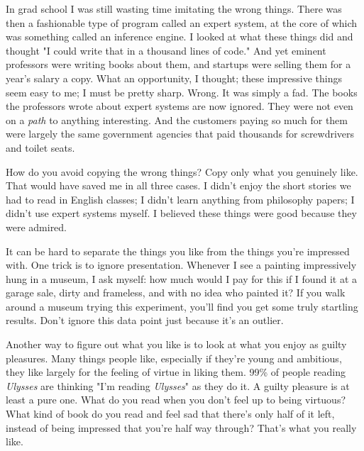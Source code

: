 In grad school I was still wasting time
                  imitating the wrong things. There was then a fashionable type
                  of program called an expert system, at the core of which was
                  something called an inference engine. I looked at what these
                  things did and thought "I could write that in a thousand lines
                  of code." And yet eminent professors were writing books about
                  them, and startups were selling them for a year's salary a
                  copy. What an opportunity, I thought; these impressive things
                  seem easy to me; I must be pretty sharp. Wrong. It was simply
                  a fad. The books the professors wrote about expert systems are
                  now ignored. They were not even on a \emph{path} to anything
                  interesting. And the customers paying so much for them were
                  largely the same government agencies that paid thousands for
                  screwdrivers and toilet seats.

How do you avoid
                  copying the wrong things? Copy only what you genuinely like.
                  That would have saved me in all three cases. I didn't enjoy
                  the short stories we had to read in English classes; I didn't
                  learn anything from philosophy papers; I didn't use expert
                  systems myself. I believed these things were good because they
                  were admired.

It can be hard to separate the things
                  you like from the things you're impressed with. One trick is
                  to ignore presentation. Whenever I see a painting impressively
                  hung in a museum, I ask myself: how much would I pay for this
                  if I found it at a garage sale, dirty and frameless, and with
                  no idea who painted it? If you walk around a museum trying
                  this experiment, you'll find you get some truly startling
                  results. Don't ignore this data point just because it's an
                  outlier.

Another way to figure out what you like is
                  to look at what you enjoy as guilty pleasures. Many things
                  people like, especially if they're young and ambitious, they
                  like largely for the feeling of virtue in liking them. 99\% of
                  people reading \emph{Ulysses} are thinking "I'm reading
                  \emph{Ulysses}" as they do it. A guilty pleasure is at least a
                  pure one. What do you read when you don't feel up to being
                  virtuous? What kind of book do you read and feel sad that
                  there's only half of it left, instead of being impressed that
                  you're half way through? That's what you really like.

